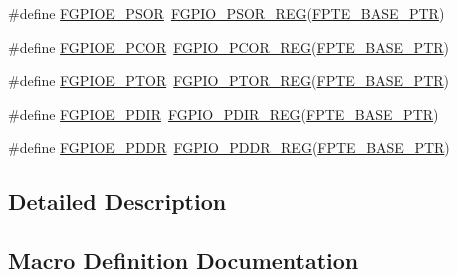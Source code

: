\begin{DoxyCompactItemize}
\item 
\#define \hyperlink{group___f_g_p_i_o___register___accessor___macros_ga2a3137754a9e64c35baee378b6cabdd5}{F\+G\+P\+I\+O\+E\+\_\+\+P\+S\+OR}~\hyperlink{group___f_g_p_i_o___register___accessor___macros_ga0fd5e604dcdaba6e42f0d06f9e4410bb}{F\+G\+P\+I\+O\+\_\+\+P\+S\+O\+R\+\_\+\+R\+EG}(\hyperlink{group___f_g_p_i_o___peripheral_ga191ce600c147c06111ecea5b3b0aa6fb}{F\+P\+T\+E\+\_\+\+B\+A\+S\+E\+\_\+\+P\+TR})
\item 
\#define \hyperlink{group___f_g_p_i_o___register___accessor___macros_ga1596d63e5c60f3ee962d345d7848afb5}{F\+G\+P\+I\+O\+E\+\_\+\+P\+C\+OR}~\hyperlink{group___f_g_p_i_o___register___accessor___macros_gab5033219fb0e50c7dd60b3fbf1cc2dde}{F\+G\+P\+I\+O\+\_\+\+P\+C\+O\+R\+\_\+\+R\+EG}(\hyperlink{group___f_g_p_i_o___peripheral_ga191ce600c147c06111ecea5b3b0aa6fb}{F\+P\+T\+E\+\_\+\+B\+A\+S\+E\+\_\+\+P\+TR})
\item 
\#define \hyperlink{group___f_g_p_i_o___register___accessor___macros_gade2396a0521c669453c144aff864476a}{F\+G\+P\+I\+O\+E\+\_\+\+P\+T\+OR}~\hyperlink{group___f_g_p_i_o___register___accessor___macros_gabbed07bd5d1202717414b3682c03039c}{F\+G\+P\+I\+O\+\_\+\+P\+T\+O\+R\+\_\+\+R\+EG}(\hyperlink{group___f_g_p_i_o___peripheral_ga191ce600c147c06111ecea5b3b0aa6fb}{F\+P\+T\+E\+\_\+\+B\+A\+S\+E\+\_\+\+P\+TR})
\item 
\#define \hyperlink{group___f_g_p_i_o___register___accessor___macros_ga9327c2aa4b8fd58ab75ef5fa46a6c9cf}{F\+G\+P\+I\+O\+E\+\_\+\+P\+D\+IR}~\hyperlink{group___f_g_p_i_o___register___accessor___macros_gacc856fb3636de989a65e71d60efb8ef8}{F\+G\+P\+I\+O\+\_\+\+P\+D\+I\+R\+\_\+\+R\+EG}(\hyperlink{group___f_g_p_i_o___peripheral_ga191ce600c147c06111ecea5b3b0aa6fb}{F\+P\+T\+E\+\_\+\+B\+A\+S\+E\+\_\+\+P\+TR})
\item 
\#define \hyperlink{group___f_g_p_i_o___register___accessor___macros_ga808099029ad996db9abe97d36a1c7b9d}{F\+G\+P\+I\+O\+E\+\_\+\+P\+D\+DR}~\hyperlink{group___f_g_p_i_o___register___accessor___macros_ga47e9fea71a8834584cf1233cbad492bc}{F\+G\+P\+I\+O\+\_\+\+P\+D\+D\+R\+\_\+\+R\+EG}(\hyperlink{group___f_g_p_i_o___peripheral_ga191ce600c147c06111ecea5b3b0aa6fb}{F\+P\+T\+E\+\_\+\+B\+A\+S\+E\+\_\+\+P\+TR})
\end{DoxyCompactItemize}


\subsection{Detailed Description}


\subsection{Macro Definition Documentation}
